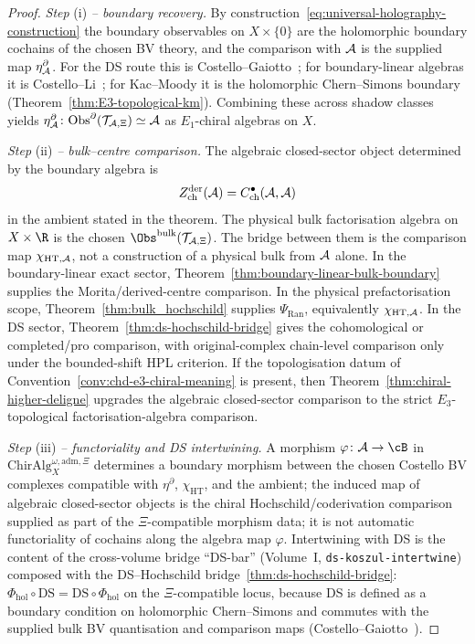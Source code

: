 \begin{proof}
\emph{Step} (i) \emph{-- boundary recovery.}
By construction~\eqref{eq:universal-holography-construction} the
boundary observables on $X\times\{0\}$ are the holomorphic boundary
cochains of the chosen BV theory, and the comparison with \(\mathcal{A}\) is
the supplied map \(\eta^\partial_{\mathcal{A}}\). For the DS route this is
Costello--Gaiotto~\cite[\S 4]{CostelloGaiotto18}; for boundary-linear
algebras it is Costello--Li~\cite{CL16}; for Kac--Moody it is the
holomorphic Chern--Simons boundary
(Theorem~\ref{thm:E3-topological-km}).
Combining these across shadow classes yields
$\eta^\partial_{\mathcal{A}}\colon
\mathrm{Obs}^{\partial}(\mathcal{T}_{\mathcal{A},\Xi})\simeq\mathcal{A}$ as
$E_1$-chiral algebras on $X$.

\emph{Step} (ii) \emph{-- bulk--centre comparison.}
The algebraic closed-sector object determined by the boundary algebra
is
\[
Z^{\mathrm{der}}_{\mathrm{ch}}(\mathcal{A})
=C^\bullet_{\mathrm{ch}}(\mathcal{A},\mathcal{A})
\]
in the ambient stated in the theorem.  The physical bulk factorisation
algebra on $X\times\R$ is the chosen
\(\Obs^{\mathrm{bulk}}(\mathcal{T}_{\cA,\Xi})\).  The bridge between
them is the comparison map \(\chi_{\mathrm{HT},\mathcal{A}}\), not a
construction of a physical bulk from \(\mathcal{A}\) alone.  In the
boundary-linear exact sector,
Theorem~\ref{thm:boundary-linear-bulk-boundary} supplies the
Morita/derived-centre comparison.  In the physical prefactorisation
scope, Theorem~\ref{thm:bulk_hochschild} supplies
\(\Psi_{\mathrm{Ran}}\), equivalently \(\chi_{\mathrm{HT},\mathcal{A}}\).  In
the DS sector, Theorem~\ref{thm:ds-hochschild-bridge} gives the
cohomological or completed/pro comparison, with original-complex
chain-level comparison only under the bounded-shift HPL criterion.
If the topologisation datum of
Convention~\ref{conv:chd-e3-chiral-meaning} is present, then
Theorem~\ref{thm:chiral-higher-deligne} upgrades the algebraic
closed-sector comparison to the strict $E_3$-topological
factorisation-algebra comparison.

\emph{Step} (iii) \emph{-- functoriality and DS intertwining.}
A morphism $\varphi\colon\cA\to\cB$ in
$\mathrm{ChirAlg}^{\omega,\mathrm{adm},\Xi}_X$ determines a boundary
morphism between the chosen Costello BV complexes compatible with
\(\eta^\partial\), \(\chi_{\mathrm{HT}}\), and the ambient; the
induced map of algebraic closed-sector objects is the chiral
Hochschild/coderivation comparison supplied as part of the
\(\Xi\)-compatible morphism data; it is not automatic functoriality of
cochains along the algebra map \(\varphi\).
Intertwining with DS is the content of the cross-volume bridge
``DS-bar'' (Volume~I, \texttt{ds-koszul-intertwine}) composed with
the DS--Hochschild bridge~\ref{thm:ds-hochschild-bridge}:
$\Phi_{\mathrm{hol}}\circ\mathrm{DS}=\mathrm{DS}\circ\Phi_{\mathrm{hol}}$
on the \(\Xi\)-compatible locus, because DS is defined as a boundary
condition on holomorphic Chern--Simons and commutes with the supplied
bulk BV quantisation and comparison maps
(Costello--Gaiotto~\cite[\S 5]{CostelloGaiotto18}).


\end{proof}
